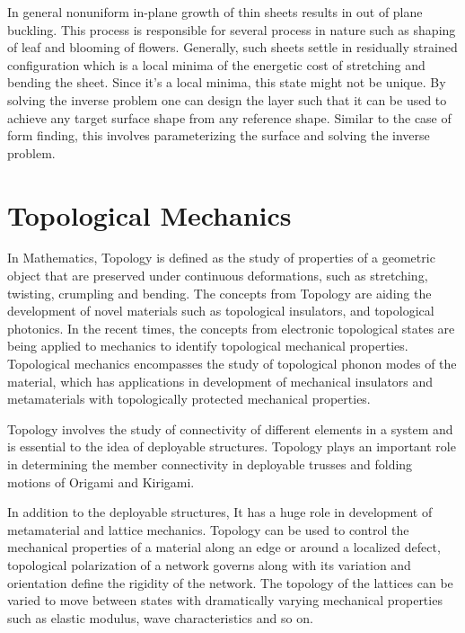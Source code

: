 In general nonuniform in-plane growth of thin sheets results in out of plane buckling. This process is responsible for several process in nature such as shaping of leaf and blooming of flowers. Generally, such sheets settle in residually strained configuration which is a local minima of the energetic cost of stretching and bending the sheet. Since it's a local minima, this state might not be unique. By solving the inverse problem one can design the layer such that it can be used to achieve any target surface shape from any reference shape\cite{va}. Similar to the case of form finding, this involves parameterizing the surface and solving the inverse problem.

\section{Topological Mechanics}
In Mathematics, Topology is defined as the study of properties of a geometric object that are preserved under continuous deformations, such as stretching, twisting, crumpling and bending. The concepts from Topology are aiding the development of novel materials such as topological insulators, and topological photonics. In the recent times, the concepts from electronic topological states are being applied to mechanics to identify topological mechanical properties. Topological mechanics encompasses the study of topological phonon modes of the material, which has applications in development of mechanical insulators and metamaterials with topologically protected mechanical properties.\cite{Ma, Rock, Baardink489, Che}

Topology involves the study of connectivity of different elements in a system and is essential to the idea of deployable structures. Topology plays an important role in determining the member connectivity in deployable trusses and folding motions of Origami and Kirigami\cite{Che}.

In addition to the deployable structures, It has a huge role in development of metamaterial\cite{Rock, Berto, Surj} and lattice mechanics\cite{Ma}. Topology can be used to control the mechanical properties of a material along an edge or around a localized defect, topological polarization of a network governs along with its variation and orientation define the rigidity of the network. The topology of the lattices can be varied to move between states with dramatically varying mechanical properties such as elastic modulus, wave characteristics and so on. 

